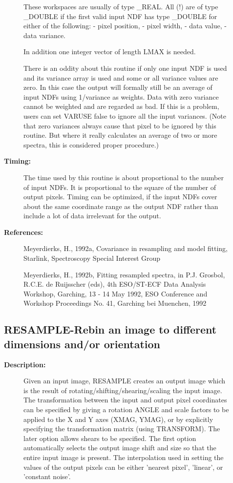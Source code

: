 \begin{description}
\begin{description}
   These workspaces are usually of type \_REAL. All (!) are of type
   \_DOUBLE if the first valid input NDF has type \_DOUBLE for either
   of the following:
   -  pixel position,
   -  pixel width,
   -  data value,
   -  data variance.

   In addition one integer vector of length LMAX is needed.

   There is an oddity about this routine if only one input NDF is
   used and its variance array is used and some or all variance
   values are zero. In this case the output will formally still be an
   average of input NDFs using 1/variance as weights. Data with zero
   variance cannot be weighted and are regarded as bad. If this is a
   problem, users can set VARUSE false to ignore all the input
   variances. (Note that zero variances always cause that pixel to be
   ignored by this routine. But where it really calculates an average
   of two or more spectra, this is considered proper procedure.)

\item [\textbf{Timing:}]
   The time used by this routine is about proportional to the number
   of input NDFs. It is proportional to the square of the number of
   output pixels. Timing can be optimized, if the input NDFs cover
   about the same coordinate range as the output NDF rather than
   include a lot of data irrelevant for the output.

\item [\textbf{References:}]
   Meyerdierks, H., 1992a, Covariance in resampling and model fitting,
   Starlink, Spectroscopy Special Interest Group

   Meyerdierks, H., 1992b, Fitting resampled spectra, in P.J.
   Grosbol, R.C.E. de Ruijsscher (eds), 4th ESO/ST-ECF Data Analysis
   Workshop, Garching, 13 - 14 May 1992, ESO Conference and Workshop
   Proceedings No. 41, Garching bei Muenchen, 1992

\end{description}
\subsection{RESAMPLE-\label{RESAMPLE}Rebin an image to different dimensions and/or orientation}
\begin{description}

\item [\textbf{Description:}]
 Given an input image, RESAMPLE creates an output image which
 is the result of rotating/shifting/shearing/scaling the input
 image. The transformation between the input and output pixel
 coordinates can be specified by giving a rotation ANGLE and
 scale factors to be applied to the X and Y axes (XMAG, YMAG),
 or by explicitly specifying the transformation matrix (using
 TRANSFORM). The later option allows shears to be specified.
 The first option automatically selects the output image
 shift and size so that the entire input image is present.
 The interpolation used in setting the values of the output
 pixels can be either 'nearest pixel', 'linear', or 'constant
 noise'.


\end{description}
\end{description}
